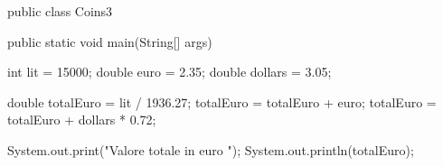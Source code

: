 \begin{unipdcode}[language=Java]
public class Coins3 {
    public static void main(String[] args) {
        int lit = 15000;
        double euro = 2.35;
        double dollars = 3.05;

        double totalEuro = lit / 1936.27;
        totalEuro = totalEuro + euro;
        totalEuro = totalEuro + dollars * 0.72;

        System.out.print("Valore totale in euro ");
        System.out.println(totalEuro);
    }
}
\end{unipdcode}
